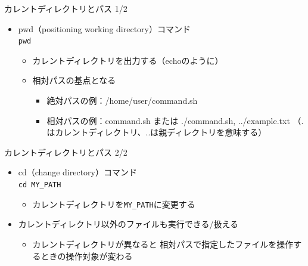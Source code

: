 \documentclass[12pt,aspectratio=169]{beamer}
\begin{document}
\begin{frame}{カレントディレクトリとパス 1/2}
  \begin{itemize}
    \item pwd（positioning working directory）コマンド\\
      \texttt{pwd}
      \begin{itemize}
        \item カレントディレクトリを出力する（echoのように）
        \item 相対パスの基点となる
          \begin{itemize}
            \item 絶対パスの例：/home/user/command.sh
            \item 相対パスの例：command.sh または ./command.sh, ../example.txt （.はカレントディレクトリ、..は親ディレクトリを意味する）
          \end{itemize}
      \end{itemize}

  \end{itemize}

\end{frame}


\begin{frame}{カレントディレクトリとパス 2/2}
  \begin{itemize}
    \item cd（change directory）コマンド\\
      \texttt{cd MY\_PATH}
      \begin{itemize}
        \item カレントディレクトリを\texttt{MY\_PATH}に変更する
      \end{itemize}

    \item カレントディレクトリ以外のファイルも実行できる/扱える
      \begin{itemize}
        \item カレントディレクトリが異なると 相対パスで指定したファイルを操作するときの操作対象が変わる
      \end{itemize}

  \end{itemize}

\end{frame}
\end{document}
